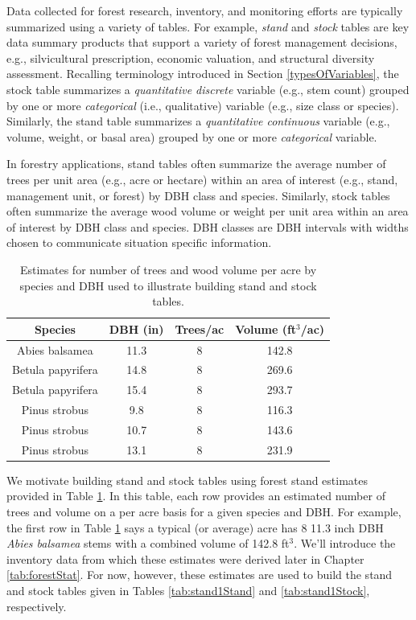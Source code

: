 \documentclass[
  11pt,
]{krantz}
\theoremstyle{definition}
\theoremstyle{definition}
\theoremstyle{definition}
\theoremstyle{definition}
\theoremstyle{remark}
\begin{document}
Data collected for forest research, inventory, and monitoring efforts are typically summarized using a variety of tables. For example, \emph{stand} and \emph{stock} tables are key data summary products that support a variety of forest management decisions, e.g., silvicultural prescription, economic valuation, and structural diversity assessment. Recalling terminology introduced in Section \ref{typesOfVariables}, the stock table summarizes a \emph{quantitative discrete} variable (e.g., stem count) grouped by one or more \emph{categorical} (i.e., qualitative) variable (e.g., size class or species). Similarly, the stand table summarizes a \emph{quantitative continuous} variable (e.g., volume, weight, or basal area) grouped by one or more \emph{categorical} variable.

In forestry applications, stand tables often summarize the average number of trees per unit area (e.g., acre or hectare) within an area of interest (e.g., stand, management unit, or forest) by DBH class and species. Similarly, stock tables often summarize the average wood volume or weight per unit area within an area of interest by DBH class and species. DBH classes are DBH intervals with widths chosen to communicate situation specific information.

\begin{table}[!h]

\caption{\label{tab:stand1Ests}Estimates for number of trees and wood volume per acre by species and DBH used to illustrate building stand and stock tables.}
\centering
\begin{tabular}[t]{cccc}
\toprule
Species & DBH (in) & Trees/ac & Volume (ft$^3$/ac)\\
\midrule
Abies balsamea & 11.3 & 8 & 142.8\\
Betula papyrifera & 14.8 & 8 & 269.6\\
Betula papyrifera & 15.4 & 8 & 293.7\\
Pinus strobus & 9.8 & 8 & 116.3\\
Pinus strobus & 10.7 & 8 & 143.6\\
Pinus strobus & 13.1 & 8 & 231.9\\
\bottomrule
\end{tabular}
\end{table}

We motivate building stand and stock tables using forest stand estimates provided in Table \ref{tab:stand1Ests}. In this table, each row provides an estimated number of trees and volume on a per acre basis for a given species and DBH. For example, the first row in Table \ref{tab:stand1Ests} says a typical (or average) acre has 8 11.3 inch DBH \emph{Abies balsamea} stems with a combined volume of 142.8 ft\(^3\). We'll introduce the inventory data from which these estimates were derived later in Chapter \ref{tab:forestStat}. For now, however, these estimates are used to build the stand and stock tables given in Tables \ref{tab:stand1Stand} and \ref{tab:stand1Stock}, respectively.
\end{document}
